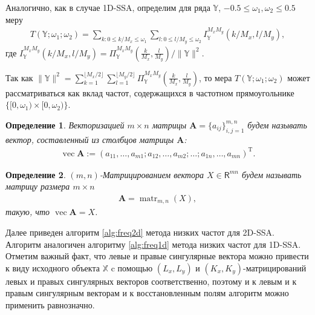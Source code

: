 \documentclass[specialist,
               substylefile = spbu.rtx,
               subf,href,colorlinks=true, 12pt]{disser}
\def\vec{\mathop{\mathrm{vec}}}
\def\matr{\mathop{\mathrm{matr}}}
\newtheorem{defn}{Определение}
\begin{document}
Аналогично, как в случае 1D-SSA, определим для ряда $\mathbb{Y}$, $-0.5 \leqslant \omega_{1},  \omega_{2} \leqslant 0.5$ меру
\begin{gather}
\label{eq:T_measure_2d}
T(\mathbb{Y}; \omega_{1}; \omega_{2}) = \sum_{k: 0 \leqslant k/M_x \leqslant \omega_{1}} \sum_{l: 0 \leqslant l/M_y \leqslant \omega_{2}}  I_\mathbb{Y}^{M_x M_y}(k/M_x, l/M_y),
\end{gather}
где $I_\mathbb{Y}^{M_x M_y}(k/M_x, l/M_y) =\Pi_\mathbb{Y}^{M_x M_y} \left(\frac{k}{M_x}, \frac{l}{M_y}\right) / \|\mathbb{Y}\|^2$.

Так как $\|\mathbb{Y}\|^2  =  \sum_{k=1}^{\lfloor M_x/2 \rfloor}  \sum_{l=1}^{\lfloor M_y/2 \rfloor}  \Pi_{\mathbb{Y}}^{M_x M_y} \left(\frac{k}{M_x}, \frac{l}{M_y}\right)$, то мера $T(\mathbb{Y}; \omega_{1}; \omega_{2}) $ может рассматриваться как вклад частот, содержащихся в частотном прямоугольнике $\{[0, \omega_{1}) \times [0, \omega_{2}) \}$.

\begin{defn}
\emph{Векторизацией $m \times n$} матрицы $\mathbf{A} = \{a_{ij}\}_{i,j=1}^{m,n}$ будем называть вектор, составленный из столбцов матрицы $\mathbf{A}$:
\begin{gather*}
\vec \mathbf{A} := (a_{11}, \ldots, a_{m1}; a_{12}, \ldots, a_{m2}; \ldots;  a_{1n}, \ldots, a_{mn})^{\mathrm{T}}.
\end{gather*}
\end{defn}

\begin{defn}
 \emph{$(m,n)$-Матрицированием} вектора $X \in \mathsf{R}^{mn}$ будем называть матрицу размера $m \times n$
\begin{gather*}
 \mathbf{A} = \matr_{m,n} (X),
\end{gather*}
такую, что $\vec \mathbf{A} = X$.
\end{defn}

Далее приведен алгоритм \ref{alg:freq2d} метода низких частот для 2D-SSA.
Алгоритм аналогичен алгоритму \ref{alg:freq1d} метода низких частот для 1D-SSA.
Отметим важный факт, что левые и правые сингулярные вектора можно привести к виду исходного объекта $\mathbb{X}$ c помощью $(L_x, L_y)$ и $(K_x, K_y)$-матрицирований левых и правых сингулярных векторов соответственно, поэтому и к левым и к правым сингулярным векторам и к восстановленным полям алгоритм можно применить равнозначно. 
\end{document}
